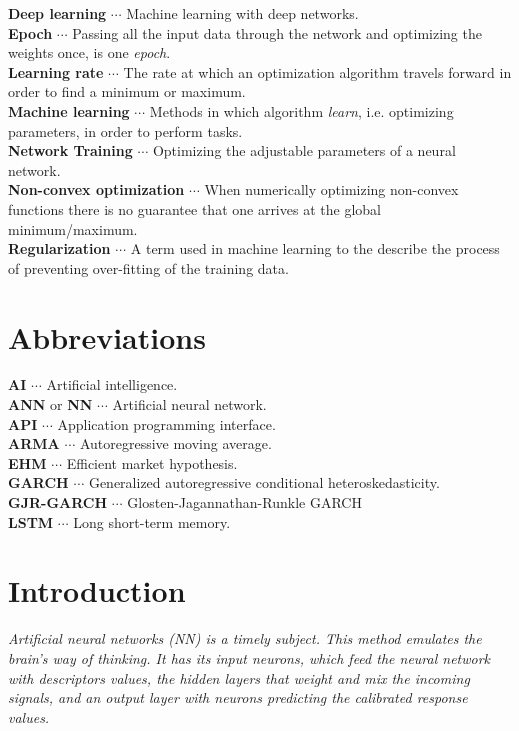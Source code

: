 \documentclass[12pt, letterpaper]{amsart}%
\begin{document}
\noindent
\textbf{Deep learning} $\cdots$ Machine learning with deep networks.
\\

\noindent
\textbf{Epoch} $\cdots$ Passing all the input data through the network and optimizing the weights once, is one \textit{epoch}.
\\

\noindent
\textbf{Learning rate} $\cdots$ The rate at which an optimization algorithm travels forward in order to find a minimum or maximum.
\\

\noindent
\textbf{Machine learning} $\cdots$ Methods in which algorithm \textit{learn}, i.e. optimizing parameters, in order to perform tasks. 
\\

\noindent
\textbf{Network Training} $\cdots$ Optimizing the adjustable parameters of a neural network. 
\\

\noindent
\textbf{Non-convex optimization} $\cdots$ When numerically optimizing non-convex functions there is no guarantee that one arrives at the global minimum/maximum.
\\

\noindent
\textbf{Regularization} $\cdots$ A term used in machine learning to the describe the process of preventing over-fitting of the training data.

\section*{Abbreviations}
\noindent
\textbf{AI} $\cdots$ Artificial intelligence.
\\
\textbf{ANN} or \textbf{NN} $\cdots$ Artificial neural network.
\\
\textbf{API} $\cdots$ Application programming interface.
\\
\textbf{ARMA} $\cdots$ Autoregressive moving average.
\\
\textbf{EHM} $\cdots$ Efficient market hypothesis.
\\
\textbf{GARCH} $\cdots$ Generalized autoregressive conditional heteroskedasticity.
\\
\textbf{GJR-GARCH} $\cdots$ Glosten-Jagannathan-Runkle GARCH
\\
\textbf{LSTM} $\cdots$ Long short-term memory.

\newpage

\section{Introduction}
\begin{displayquote}
\textit{Artificial neural networks (NN) is a timely subject. This method emulates the brain's way of thinking. It has its input neurons, which feed the neural network with descriptors values, the hidden layers that weight and mix the incoming signals, and an output layer with neurons predicting the calibrated response values.}
\end{displayquote}
\end{document}
